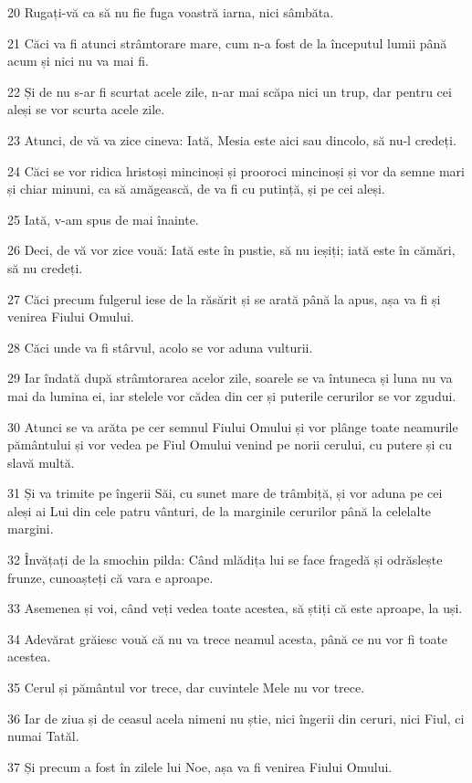 \par 20 Rugați-vă ca să nu fie fuga voastră iarna, nici sâmbăta.
\par 21 Căci va fi atunci strâmtorare mare, cum n-a fost de la începutul lumii până acum și nici nu va mai fi.
\par 22 Și de nu s-ar fi scurtat acele zile, n-ar mai scăpa nici un trup, dar pentru cei aleși se vor scurta acele zile.
\par 23 Atunci, de vă va zice cineva: Iată, Mesia este aici sau dincolo, să nu-l credeți.
\par 24 Căci se vor ridica hristoși mincinoși și prooroci mincinoși și vor da semne mari și chiar minuni, ca să amăgească, de va fi cu putință, și pe cei aleși.
\par 25 Iată, v-am spus de mai înainte.
\par 26 Deci, de vă vor zice vouă: Iată este în pustie, să nu ieșiți; iată este în cămări, să nu credeți.
\par 27 Căci precum fulgerul iese de la răsărit și se arată până la apus, așa va fi și venirea Fiului Omului.
\par 28 Căci unde va fi stârvul, acolo se vor aduna vulturii.
\par 29 Iar îndată după strâmtorarea acelor zile, soarele se va întuneca și luna nu va mai da lumina ei, iar stelele vor cădea din cer și puterile cerurilor se vor zgudui.
\par 30 Atunci se va arăta pe cer semnul Fiului Omului și vor plânge toate neamurile pământului și vor vedea pe Fiul Omului venind pe norii cerului, cu putere și cu slavă multă.
\par 31 Și va trimite pe îngerii Săi, cu sunet mare de trâmbiță, și vor aduna pe cei aleși ai Lui din cele patru vânturi, de la marginile cerurilor până la celelalte margini.
\par 32 Învățați de la smochin pilda: Când mlădița lui se face fragedă și odrăslește frunze, cunoașteți că vara e aproape.
\par 33 Asemenea și voi, când veți vedea toate acestea, să știți că este aproape, la uși.
\par 34 Adevărat grăiesc vouă că nu va trece neamul acesta, până ce nu vor fi toate acestea.
\par 35 Cerul și pământul vor trece, dar cuvintele Mele nu vor trece.
\par 36 Iar de ziua și de ceasul acela nimeni nu știe, nici îngerii din ceruri, nici Fiul, ci numai Tatăl.
\par 37 Și precum a fost în zilele lui Noe, așa va fi venirea Fiului Omului.
